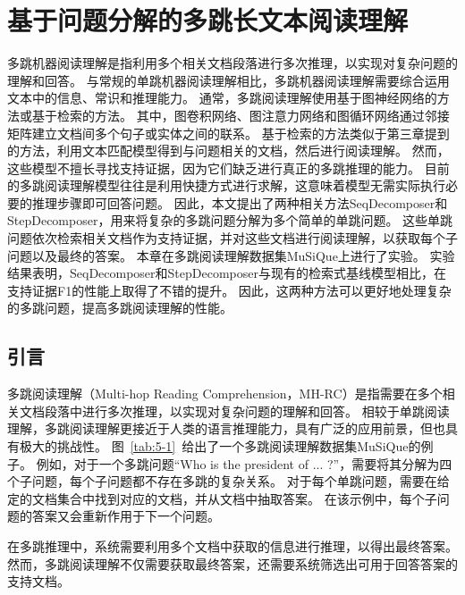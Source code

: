 \chapter{基于问题分解的多跳长文本阅读理解}
多跳机器阅读理解是指利用多个相关文档段落进行多次推理，以实现对复杂问题的理解和回答。
与常规的单跳机器阅读理解相比，多跳机器阅读理解需要综合运用文本中的信息、常识和推理能力。
通常，多跳阅读理解使用基于图神经网络的方法或基于检索的方法。
其中，图卷积网络、图注意力网络和图循环网络通过邻接矩阵建立文档间多个句子或实体之间的联系。
基于检索的方法类似于第三章提到的方法，利用文本匹配模型得到与问题相关的文档，然后进行阅读理解。
然而，这些模型不擅长寻找支持证据，因为它们缺乏进行真正的多跳推理的能力。
目前的多跳阅读理解模型往往是利用快捷方式进行求解，这意味着模型无需实际执行必要的推理步骤即可回答问题。
因此，本文提出了两种相关方法SeqDecomposer和StepDecomposer，用来将复杂的多跳问题分解为多个简单的单跳问题。
这些单跳问题依次检索相关文档作为支持证据，并对这些文档进行阅读理解，以获取每个子问题以及最终的答案。
本章在多跳阅读理解数据集MuSiQue上进行了实验。
实验结果表明，SeqDecomposer和StepDecomposer与现有的检索式基线模型相比，在支持证据F1的性能上取得了不错的提升。
因此，这两种方法可以更好地处理复杂的多跳问题，提高多跳阅读理解的性能。

\section{引言}
多跳阅读理解\cite{Yang2018HotpotQAAD}（Multi-hop Reading Comprehension，MH-RC）是指需要在多个相关文档段落中进行多次推理，以实现对复杂问题的理解和回答。
相较于单跳阅读理解，多跳阅读理解更接近于人类的语言推理能力，具有广泛的应用前景，但也具有极大的挑战性。
图~\ref{tab:5-1}~给出了一个多跳阅读理解数据集MuSiQue的例子。
例如，对于一个多跳问题“Who is the president of ... ?”，需要将其分解为四个子问题，每个子问题都不存在多跳的复杂关系。
对于每个单跳问题，需要在给定的文档集合中找到对应的文档，并从文档中抽取答案。
在该示例中，每个子问题的答案又会重新作用于下一个问题。

在多跳推理中，系统需要利用多个文档中获取的信息进行推理，以得出最终答案。
然而，多跳阅读理解不仅需要获取最终答案，还需要系统筛选出可用于回答答案的支持文档。


